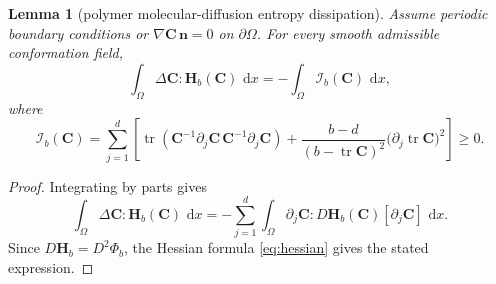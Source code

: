\documentclass[10pt,a4paper]{amsart}
\newtheorem{lemma}{Lemma}
\newcommand{\CC}{\bm C}
\newcommand{\HH}{\bm H}
\newcommand{\dd}{\,\mathrm d}
\newcommand{\nn}{\bm n}
\newcommand{\tr}{\operatorname{tr}}
\begin{document}
\begin{lemma}[polymer molecular-diffusion entropy dissipation]
Assume periodic boundary conditions or $\nabla\CC\,\nn=0$ on $\partial\Omega$.  For every smooth admissible conformation field,
\[
  \int_\Omega \Delta\CC:\HH_b(\CC)\,\dd x
  =
  -\int_\Omega \mathcal I_b(\CC)\,\dd x ,
\]
where
\[
  \mathcal I_b(\CC)
  =
  \sum_{j=1}^d
  \left[
  \tr\!\left(\CC^{-1}\partial_j\CC\,\CC^{-1}\partial_j\CC\right)
  +
  \frac{b-d}{(b-\tr\CC)^2}\bigl(\partial_j\tr\CC\bigr)^2
  \right]\ge0 .
\]
\end{lemma}

\begin{proof}
Integrating by parts gives
\[
  \int_\Omega \Delta\CC:\HH_b(\CC)\,\dd x
  =
  -\sum_{j=1}^d\int_\Omega
  \partial_j\CC:D\HH_b(\CC)[\partial_j\CC]\,\dd x .
\]
Since $D\HH_b=D^2\Phi_b$, the Hessian formula \eqref{eq:hessian} gives the stated expression.
\end{proof}
\end{document}
